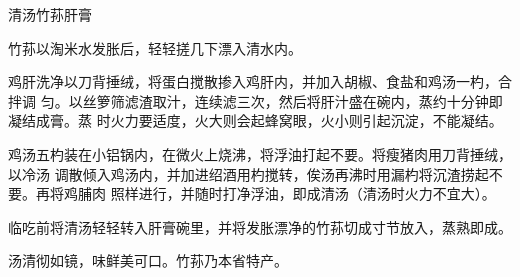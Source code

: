%
%
%
%
%
%
%
\begin{recipe}{清汤竹荪肝膏}

\ingredients


\preparation

竹荪以淘米水发胀后，轻轻搓几下漂入清水内。

鸡肝洗净以刀背捶绒，将蛋白搅散掺入鸡肝内，并加入胡椒、食盐和鸡汤一杓，合拌调
匀。以丝箩筛滤渣取汁，连续滤三次，然后将肝汁盛在碗内，蒸约十分钟即凝结成膏。蒸
时火力要适度，火大则会起蜂窝眼，火小则引起沉淀，不能凝结。

鸡汤五杓装在小铝锅内，在微火上烧沸，将浮油打起不要。将瘦猪肉用刀背捶绒，以冷汤
调散倾入鸡汤内，并加进绍酒用杓搅转，俟汤再沸时用漏杓将沉渣捞起不要。再将鸡脯肉
照样进行，并随时打净浮油，即成清汤（清汤时火力不宜大）。

临吃前将清汤轻轻转入肝膏碗里，并将发胀漂净的竹荪切成寸节放入，蒸熟即成。

\features

汤清彻如镜，味鲜美可口。竹荪乃本省特产。

\end{recipe}

